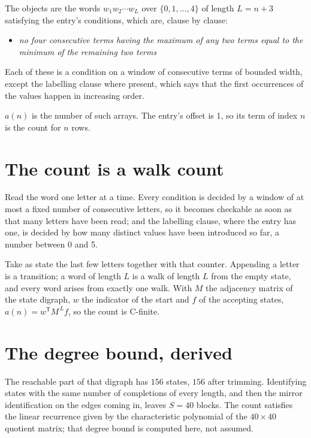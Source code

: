 \documentclass[11pt]{article}
\theoremstyle{definition}
\begin{document}
The objects are the words $w_1 w_2 \cdots w_L$ over $\{0,1,\dots,4\}$ of length $L = n + 3$ satisfying the entry's conditions, which are, clause by clause:

\begin{itemize}

\item {\itshape no four consecutive terms having the maximum of any two terms equal to the minimum of the remaining two terms}

\end{itemize}

Each of these is a condition on a window of consecutive terms of bounded width, except the labelling clause where present, which says that the first occurrences of the values happen in increasing order.

$a(n)$ is the number of such arrays. The entry's offset is 1, so its term of index $n$ is the count for $n$ rows.

\section{The count is a walk count}

Read the word one letter at a time. Every condition is decided by a window of at most a fixed number of consecutive letters, so it becomes checkable as soon as that many letters have been read; and the labelling clause, where the entry has one, is decided by how many distinct values have been introduced so far, a number between $0$ and 5.

Take as state the last few letters together with that counter. Appending a letter is a transition; a word of length $L$ is a walk of length $L$ from the empty state, and every word arises from exactly one walk. With $M$ the adjacency matrix of the state digraph, $w$ the indicator of the start and $f$ of the accepting states, $a(n) = w^{\mathsf T}M^{\,L}f$, so the count is C-finite.

\section{The degree bound, derived}

The reachable part of that digraph has $156$ states, $156$ after trimming. Identifying states with the same number of completions of every length, and then the mirror identification on the edges coming in, leaves $S = 40$ blocks. The count satisfies the linear recurrence given by the characteristic polynomial of the $40\times40$ quotient matrix; that degree bound is computed here, not assumed.
\end{document}
